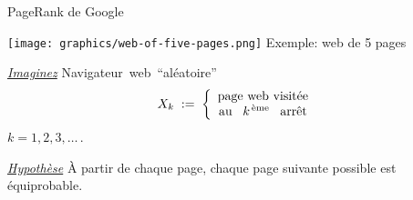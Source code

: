 \begin{frame}{\Large PageRank de Google}

\begin{multicols}{2}
	\begin{minipage}{4.5cm}
	\begin{center}
	\texttt{[image: graphics/web-of-five-pages.png]}
	\vskip 0.1cm
	\scriptsize Exemple: web de 5 pages
	\end{center}
	\end{minipage}
\pause
\columnbreak
	\begin{flushright}
	\begin{minipage}{5.5cm}
	\begin{center}
	\vskip -0.50cm
	\underline{\textit{\normalsize Imaginez}}
	\vskip 0.2cm
	Navigateur \,web\, ``al\'eatoire''
	\begin{equation*}
	X_{k} \; := \;
		\left\{\begin{array}{c}
		\textnormal{page web visit\'ee}
		\\
		\textnormal{au \, $k^{\textnormal{\,\`eme}}$ \, arr\^et}
		\end{array}\right.
	\end{equation*}
	$k = 1, 2, 3, \ldots$\,.
	\end{center}
	\end{minipage}
	\end{flushright}
\end{multicols}

\pause
\vskip 0.30cm

\begin{center}
\underline{\textit{\normalsize Hypoth\`ese}}
\vskip 0.2cm
\large\`A partir de chaque page,
\vskip 0.1cm
\Large chaque page suivante possible
\vskip 0.1cm
est \;\'equiprobable.
\end{center}


\end{frame}
